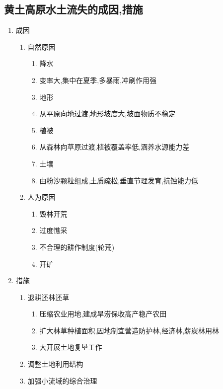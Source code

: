 \documentclass[a4paper]{article}
\begin{document}
    \subsection{黄土高原水土流失的成因,措施}
    \begin{enumerate}
        \item 成因
        \begin{enumerate}
            \item 自然原因
            \begin{enumerate}
                \item 降水
                    \item 变率大,集中在夏季,多暴雨,冲刷作用强
                \item 地形
                    \item 从平原向地过渡,地形坡度大,坡面物质不稳定
                \item 植被
                    \item 从森林向草原过渡,植被覆盖率低,涵养水源能力差
                \item 土壤
                    \item 由粉沙颗粒组成,土质疏松,垂直节理发育,抗蚀能力低
            \end{enumerate}
            \item 人为原因
            \begin{enumerate}
                \item 毁林开荒
                \item 过度憔采
                \item 不合理的耕作制度(轮荒)
                \item 开矿
            \end{enumerate}
        \end{enumerate}
        \item 措施
        \begin{enumerate}
            \item 退耕还林还草
            \begin{enumerate}
                \item 压缩农业用地,建成旱涝保收高产稳产农田
                \item 扩大林草种植面积,因地制宜营造防护林,经济林,薪炭林用林
                \item 大开展土地复垦工作
            \end{enumerate}
            \item 调整土地利用结构
            \item 加强小流域的综合治理

\end{enumerate}
\end{enumerate}
\end{document}

